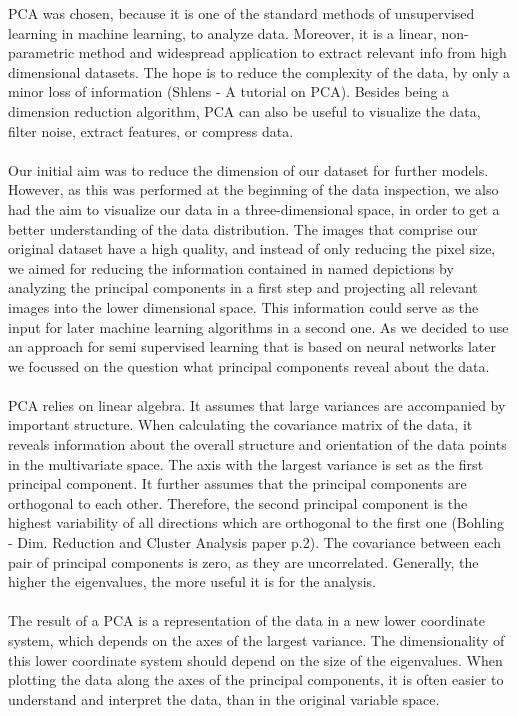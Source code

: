 PCA was chosen, because it is one of the standard methods of unsupervised learning in machine learning, to analyze data. Moreover, it is a linear, non-parametric method and widespread application to extract relevant info from high dimensional datasets. The hope is to reduce the complexity of the data, by only a minor loss of information (Shlens - A tutorial on PCA). Besides being a dimension reduction algorithm, PCA can also be useful to visualize the data, filter noise, extract features, or compress data. \\
\\
Our initial aim was to reduce the dimension of our dataset for further models. However, as this was performed at the beginning of the data inspection, we also had the aim to visualize our data in a three-dimensional space, in order to get a better understanding of the data distribution. The images that comprise our original dataset have a high quality, and instead of only reducing the pixel size, we aimed for reducing the information contained in named depictions by analyzing the principal components in a first step and projecting all relevant images into the lower dimensional space. This information could serve as the input for later machine learning algorithms in a second one. As we decided to use an approach for semi supervised learning that is based on neural networks later we focussed on the question what principal components reveal about the data. \\
 \\
PCA relies on linear algebra. It assumes that large variances are accompanied by important structure. When calculating the covariance matrix of the data, it reveals information about the overall structure and orientation of the data points in the multivariate space. The axis with the largest variance is set as the first principal component. It further assumes that the principal components are orthogonal to each other. Therefore, the second principal component is the highest variability of all directions which are orthogonal to the first one (Bohling  - Dim. Reduction and Cluster Analysis paper p.2). The covariance between each pair of principal components is zero, as they are uncorrelated. Generally, the higher the eigenvalues, the more useful it is for the analysis. \\
\\
The result of a PCA is a representation of the data in a new lower coordinate system, which depends on the axes of the largest variance. The dimensionality of this lower coordinate system should depend on the size of the eigenvalues. When plotting the data along the axes of the principal components, it is often easier to understand and interpret the data, than in the original variable space. \\
